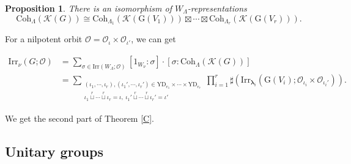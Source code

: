 \documentclass[12pt, a4paper]{amsart}
\numberwithin{equation}{section}
\newtheorem{prop}[thm]{Proposition}
\newcommand{\blam}{{\boldsymbol{\lambda}}}
\newcommand{\CK}{{\mathcal {K}}}
\newcommand{\CO}{{\mathcal {O}}}
\newcommand{\G}{{\mathrm{G}}}
\newcommand{\Irr}{{\mathrm{Irr}}}
\begin{document}
\begin{prop}
    There is an isomorphism of $W_{\Lambda}$-representations
    \begin{equation}
        \mathrm{Coh}_{\Lambda}(\CK(G)) \cong \mathrm{Coh}_{\Lambda_1}(\CK(\G(V_1))) \boxtimes \cdots \boxtimes \mathrm{Coh}_{\Lambda_r}(\CK(\G(V_r))).
    \end{equation}
\end{prop}

For a nilpotent orbit $\CO = \CO_{\iota} \times \CO_{\iota'}$, we can get

\begin{align}
    \Irr_{\nu}(G;\CO) & = \sum_{\sigma \in \Irr(W_{\Lambda};\CO)}[1_{W_\nu}:\sigma]\cdot[\sigma: \mathrm{Coh}_{\Lambda}(\CK(G))]\\
    & = \sum_{\substack{(\iota_1,\cdots,\iota_r), (\iota_1',\cdots,\iota_r') \in \mathrm{YD}_{e_1} \times \cdots \times \mathrm{YD}_{e_r}\\ \iota_1 \mathop{\sqcup}\limits^r \cdots \mathop{\sqcup}\limits^r \iota_r = \iota, \ \iota_1'  \mathop{\sqcup}\limits^r \cdots \mathop{\sqcup}\limits^r \iota_r' = \iota' }} \prod_{i=1}^{r} \sharp(\Irr_{\blam_i}(\G(V_i);\CO_{\iota_i} \times \CO_{\iota_i'})).
\end{align}

We get the second part of Theorem \ref{C}.





\subsection{Unitary groups}
\end{document}
